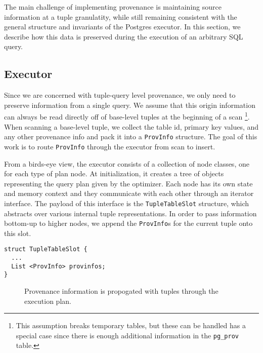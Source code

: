 
The main challenge of implementing provenance is maintaining source information at a tuple granulatity, while still remaining consistent with the general structure and invariants of the Postgres executor. In this section, we describe how this data is preserved during the execution of an arbitrary SQL query.

\subsection{Executor}

Since we are concerned with tuple-query level provenance, we only need to preserve information from a single query. We assume that this origin information can always be read directly off of base-level tuples at the beginning of a scan \footnote{This assumption breaks temporary tables, but these can be handled has a special case since there is enough additional information in the \texttt{pg\_prov} table. }. When scanning a base-level tuple, we collect the table id, primary key values, and any other provenance info and pack it into a \texttt{ProvInfo} structure. The goal of this work is to route \texttt{ProvInfo} through the executor from scan to insert.

From a birds-eye view, the executor consists of a collection of node classes, one for each type of plan node. At initialization, it creates a tree of objects representing the query plan given by the optimizer. Each node has its own state and memory context and they communicate with each other through an iterator interface. The payload of this interface is the \texttt{TupleTableSlot} structure, which abstracts over various internal tuple representations. In order to pass information bottom-up to higher nodes, we append the \texttt{ProvInfo}s for the current tuple onto this slot.


\begin{verbatim}
struct TupleTableSlot {
  ...
  List <ProvInfo> provinfos;
}
\end{verbatim}

\begin{figure}
  \scalebox{0.8} {
    
    }
    \caption {Provenance information is propogated with tuples through the execution plan. }
\end{figure}

